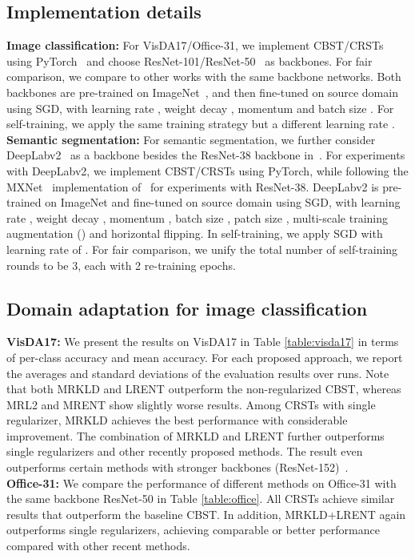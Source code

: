 \documentclass[10pt,twocolumn,letterpaper]{article}
\theoremstyle{plain}
\begin{document}
\subsection{Implementation details}
\noindent\textbf{Image classification: } For VisDA17/Office-31, we implement CBST/CRSTs using PyTorch~\cite{paszke2017automatic} and choose ResNet-101/ResNet-50~\cite{he2016deep} as backbones. For fair comparison, we compare to other works with the same backbone networks. Both backbones are pre-trained on ImageNet~\cite{deng2009imagenet}, and then fine-tuned on source domain using SGD, with learning rate , weight decay , momentum  and batch size . For self-training, we apply the same training strategy but a different learning rate .\\
\noindent\textbf{Semantic segmentation: } For semantic segmentation, we further consider DeepLabv2~\cite{chen2018deeplab} as a backbone besides the ResNet-38 backbone in~\cite{Zou_2018_ECCV}. For experiments with DeepLabv2, we implement CBST/CRSTs using PyTorch, while following the MXNet~\cite{chen2015mxnet} implementation of~\cite{Zou_2018_ECCV} for experiments with ResNet-38. DeepLabv2 is pre-trained on ImageNet and fine-tuned on source domain using SGD, with learning rate , weight decay , momentum , batch size , patch size , multi-scale training augmentation () and horizontal flipping. In self-training, we apply SGD with learning rate of . For fair comparison, we unify the total number of self-training rounds to be 3, each with 2 re-training epochs.

\subsection{Domain adaptation for image classification}
\noindent \textbf{VisDA17:}
We present the results on VisDA17 in Table \ref{table:visda17} in terms of per-class accuracy and mean accuracy. For each proposed approach, we report the averages and standard deviations of the evaluation results over  runs. Note that both MRKLD and LRENT outperform the non-regularized CBST, whereas MRL2 and MRENT show slightly worse results. Among CRSTs with single regularizer, MRKLD achieves the best performance with considerable improvement. The combination of MRKLD and LRENT further outperforms single regularizers and other recently proposed methods. The result even outperforms certain methods with stronger backbones (ResNet-152)~\cite{pinheiro2018unsupervised,sankaranarayanan2018generate}.\\
\noindent \textbf{Office-31:}
We compare the performance of different methods on Office-31 with the same backbone ResNet-50 in Table \ref{table:office}. All CRSTs achieve similar results that outperform the baseline CBST. In addition, MRKLD+LRENT again outperforms single regularizers, achieving comparable or better performance compared with other recent methods.
\end{document}
